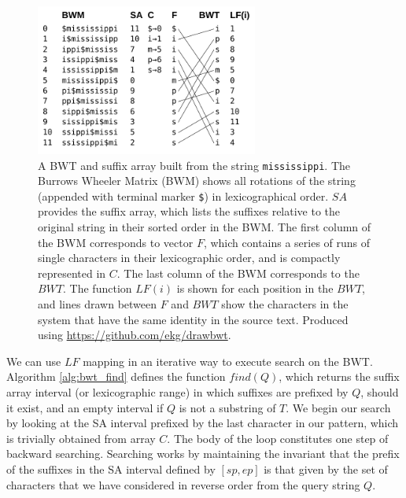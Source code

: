 \begin{figure}[htbp!]
  \centering
  \includegraphics[width=0.65\textwidth]{Chapter2/Figs/mississippi_bwt_construction.pdf}
  \caption[Building the BWT and suffix array]{
    A BWT and suffix array built from the string {\tt mississippi}.
    The Burrows Wheeler Matrix (BWM) shows all rotations of the string (appended with terminal marker {\tt \$}) in lexicographical order.
    $SA$ provides the suffix array, which lists the suffixes relative to the original string in their sorted order in the BWM.
    The first column of the BWM corresponds to vector $F$, which contains a series of runs of single characters in their lexicographic order, and is compactly represented in $C$.
    The last column of the BWM corresponds to the $BWT$.
    The function $LF(i)$ is shown for each position in the $BWT$, and lines drawn between $F$ and $BWT$ show the characters in the system that have the same identity in the source text.
    Produced using \url{https://github.com/ekg/drawbwt}.
  }
  \label{fig:bwt_construction}
\end{figure}

We can use $LF$ mapping in an iterative way to execute search on the BWT.
Algorithm \ref{alg:bwt_find} defines the function $find(Q)$, which returns the suffix array interval (or lexicographic range) in which suffixes are prefixed by $Q$, should it exist, and an empty interval if $Q$ is not a substring of $T$.
We begin our search by looking at the SA interval prefixed by the last character in our pattern, which is trivially obtained from array $C$.
The body of the loop constitutes one step of backward searching.
Searching works by maintaining the invariant that the prefix of the suffixes in the SA interval defined by $[sp, ep]$ is that given by the set of characters that we have considered in reverse order from the query string $Q$.

